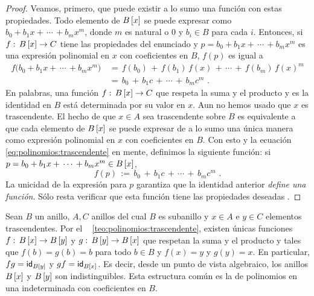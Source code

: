 \begin{proof}
	Veamos, primero, que puede existir a lo sumo una funci\'on con
	estas propiedades. Todo elemento de $\polinomios B x$ se puede
	expresar como $b_0+b_1x+\,\cdots\,+b_mx^m$, donde $m$ es natural o
	$0$ y $b_i\in B$ para cada $i$. Entonces, si
	$f:\,\polinomios B x\rightarrow C$ tiene las
	propiedades del enunciado y $p=b_0+b_1x+\,\cdots\,+b_mx^m$ es una
	expresi\'on polinomial en $x$ con coeficientes en $B$, $f(p)$ es
	igual a
	\begin{equation}
		\label{eq:polinomios:trascendente}
		\begin{aligned}
			f\big(b_0+b_1x+\,\cdots\,+b_mx^m\big) & \,=\,
				f(b_0)\,+\,f(b_1)\,f(x)\,+\,\cdots\,+\,
					f(b_m)\,f(x)^m \\
			& \,=\, b_0\,+\,b_1c\,+\,\cdots\,+\,b_mc^m
			\text{ .}
		\end{aligned}
	\end{equation}
	En palabras, una funci\'on
	$f:\,\polinomios B x\rightarrow C$ que respeta la
	suma y el producto y es la identidad en $B$ est\'a determinada
	por su valor en $x$. Aun no hemos usado que $x$ es trascendente.
	El hecho de que $x\in A$ sea trascendente sobre $B$ es equivalente
	a que cada elemento de $\polinomios B x$ se puede expresar de a lo
	sumo una \'unica manera como expresi\'on polinomial en $x$ con
	coeficientes en $B$. Con esto y la ecuaci\'on~%
	\eqref{eq:polinomios:trascendente} en mente, definimos la siguiente
	funci\'on: si $p=b_0+b_1x+\,\cdots\,+b_mx^m\in\polinomios B x$,
	\begin{displaymath}
		f(p)\,:=\,
			b_0\,+\,b_1c\,+\,\cdots\,+\,b_mc^m
		\text{ .}
	\end{displaymath}
	La unicidad de la expresi\'on para $p$ garantiza que la
	identidad anterior \emph{define una funci\'on}.
	S\'olo resta verificar que esta funci\'on tiene las propiedades
	deseadas \quedacomoejercicio.
\end{proof}

\begin{obsPolinomios}\label{obs:polinomios:trascendente}
	Sean $B$ un anillo, $A,C$ anillos del cual $B$ es subanillo y
	$x\in A$ e $y\in C$ elementos trascendentes. Por el \teoname~%
	\ref{teo:polinomios:trascendente}, existen \'unicas funciones
	$f:\,\polinomios B x\rightarrow\polinomios B y$ y
	$g:\,\polinomios B y\rightarrow\polinomios B x$ que respetan la suma
	y el producto y tales que $f(b)=g(b)=b$ para todo $b\in B$ y
	$f(x)=y$ y $g(y)=x$. En particular, $fg=\id[{\polinomios B y}]$ y
	$gf=\id[{\polinomios B x}]$. Es decir, desde un punto de vista
	algebraico, los anillos $\polinomios B x$ y $\polinomios B y$ son
	indistinguibles.
	Esta estructura com\'un es la %
	de polinomios en una indeterminada con coeficientes en $B$.
\end{obsPolinomios}

